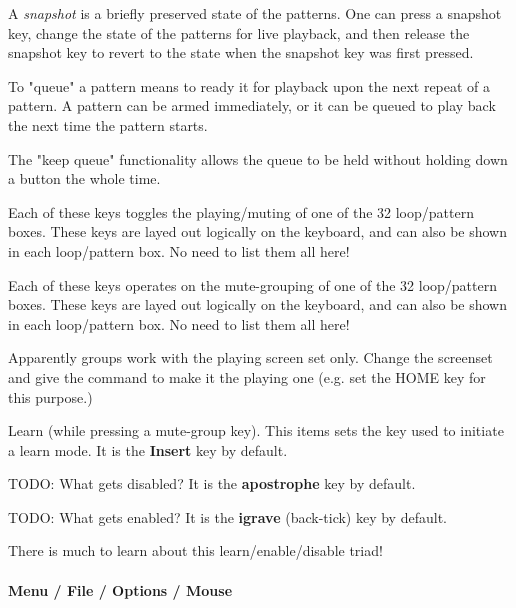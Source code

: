    A \textsl{snapshot} is a briefly preserved state of the patterns.
   One can press a snapshot key, change the state of the patterns for live
   playback, and then release the snapshot key to revert to the state when
   the snapshot key was first pressed.

   To "queue" a pattern means to ready it for playback upon the next repeat
   of a pattern.  A pattern can be armed immediately, or it can be queued to
   play back the next time the pattern starts.

   The "keep queue" functionality allows the queue to be held without
   holding down a button the whole time.

   Each of these keys toggles the playing/muting of one of the 32
   loop/pattern boxes.  These keys are layed out logically on the keyboard,
   and can also be shown in each loop/pattern box.  No need to list them all
   here!

   Each of these keys operates on the mute-grouping of one of the 32
   loop/pattern boxes.  These keys are layed out logically on the keyboard,
   and can also be shown in each loop/pattern box.  No need to list them all
   here!

   Apparently groups work with the playing screen set only.
   Change the screenset and give the command to make it the playing one
   (e.g. set the HOME key for this purpose.)

   Learn (while pressing a mute-group key).
   This items sets the key used to initiate a learn mode.
   It is the \textbf{Insert} key by default.

   TODO:  What gets disabled?
   It is the \textbf{apostrophe} key by default.

   TODO: What gets enabled?
   It is the \textbf{igrave} (back-tick) key by default.

   There is much to learn about this learn/enable/disable triad!

\paragraph{Menu / File / Options / Mouse }
\label{paragraph:seq24_menu_file_options_mouse}

